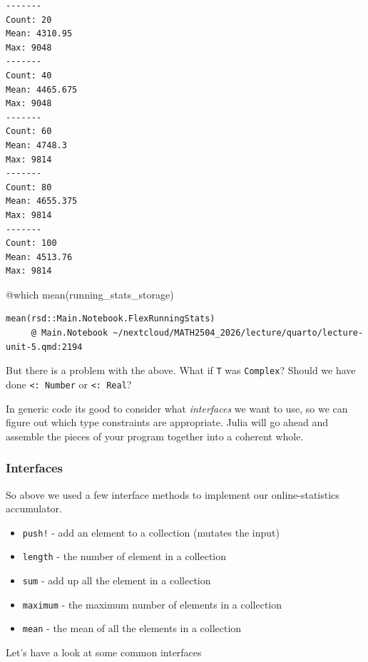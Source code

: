 \documentclass[
]{article}
\newenvironment{Shaded}{\begin{snugshade}}{\end{snugshade}}
\newcommand{\FunctionTok}[1]{\textcolor[rgb]{0.28,0.35,0.67}{#1}}
\newcommand{\NormalTok}[1]{\textcolor[rgb]{0.00,0.23,0.31}{#1}}
\newcommand{\PreprocessorTok}[1]{\textcolor[rgb]{0.68,0.00,0.00}{#1}}
\providecommand{\tightlist}{%
  \setlength{\itemsep}{0pt}\setlength{\parskip}{0pt}}
\begin{document}
\begin{verbatim}
-------
Count: 20
Mean: 4310.95
Max: 9048
-------
Count: 40
Mean: 4465.675
Max: 9048
-------
Count: 60
Mean: 4748.3
Max: 9814
-------
Count: 80
Mean: 4655.375
Max: 9814
-------
Count: 100
Mean: 4513.76
Max: 9814
\end{verbatim}

\begin{Shaded}
\begin{Highlighting}[]
\PreprocessorTok{@which} \FunctionTok{mean}\NormalTok{(running\_stats\_storage)}
\end{Highlighting}
\end{Shaded}

\begin{verbatim}
mean(rsd::Main.Notebook.FlexRunningStats)
     @ Main.Notebook ~/nextcloud/MATH2504_2026/lecture/quarto/lecture-unit-5.qmd:2194
\end{verbatim}

But there is a problem with the above. What if \texttt{T} was
\texttt{Complex}? Should we have done \texttt{\textless{}:\ Number} or
\texttt{\textless{}:\ Real}?

In generic code its good to consider what \emph{interfaces} we want to
use, so we can figure out which type constraints are appropriate. Julia
will go ahead and assemble the pieces of your program together into a
coherent whole.

\subsubsection{Interfaces}\label{interfaces}

So above we used a few interface methods to implement our
online-statistics accumulator.

\begin{itemize}
\tightlist
\item
  \texttt{push!} - add an element to a collection (mutates the input)
\item
  \texttt{length} - the number of element in a collection
\item
  \texttt{sum} - add up all the element in a collection
\item
  \texttt{maximum} - the maximum number of elements in a collection
\item
  \texttt{mean} - the mean of all the elements in a collection
\end{itemize}

Let's have a look at some common interfaces
\end{document}
